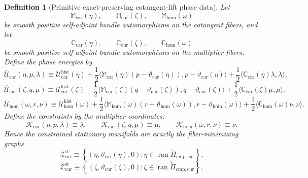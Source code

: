 \documentclass[11pt]{article}
\newcommand{\TensorEqCmpProj}{\widetilde\Pi_{\mathrm{cmp,car}}}
\newcommand{\CurEqCmpProj}{\widetilde\Pi_{\mathrm{cmp,cur}}}
\newcommand{\TensorConstraint}{\mathcal K_{\mathrm{car}}}
\newcommand{\CurConstraint}{\mathcal K_{\mathrm{cur}}}
\newcommand{\HomConstraint}{\mathcal K_{\mathrm{hom}}}
\newcommand{\TensorPhaseEnergy}{\overline{\mathcal U}_{\mathrm{car}}}
\newcommand{\CurPhaseEnergy}{\overline{\mathcal U}_{\mathrm{cur}}}
\newcommand{\HomPhaseEnergy}{\overline{\mathcal U}_{\mathrm{hom}}}
\newcommand{\TensorStationaryManifold}{\mathcal Z_{\mathrm{car}}^{\mathrm{st}}}
\newcommand{\CurStationaryManifold}{\mathcal Z_{\mathrm{cur}}^{\mathrm{st}}}
\newtheorem{definition}{Definition}
\begin{document}
\begin{definition}[Primitive exact-preserving cotangent-lift phase data]
Let
\[
\mathbb M_{\mathrm{car}}(\eta),\qquad
\mathbb M_{\mathrm{cur}}(\zeta),\qquad
\mathbb M_{\mathrm{hom}}(\omega)
\]
be smooth positive self-adjoint bundle automorphisms on the cotangent fibers, and let
\[
\mathbb C_{\mathrm{car}}(\eta),\qquad
\mathbb C_{\mathrm{cur}}(\zeta),\qquad
\mathbb C_{\mathrm{hom}}(\omega)
\]
be smooth positive self-adjoint bundle automorphisms on the multiplier fibers. Define the phase energies by
\begin{equation}
\TensorPhaseEnergy(\eta,p,\lambda)
\equiv
\mathcal U_{\mathrm{car}}^{\mathrm{hist}}(\eta)
+
\frac12\langle\mathbb M_{\mathrm{car}}(\eta)(p-\vartheta_{\mathrm{car}}(\eta)),p-\vartheta_{\mathrm{car}}(\eta)\rangle
+
\frac12\langle\mathbb C_{\mathrm{car}}(\eta)\lambda,\lambda\rangle,
\label{eq:cotangent_phase_energy_car}
\end{equation}
\begin{equation}
\CurPhaseEnergy(\zeta,q,\mu)
\equiv
\mathcal U_{\mathrm{cur}}^{\mathrm{hist}}(\zeta)
+
\frac12\langle\mathbb M_{\mathrm{cur}}(\zeta)(q-\vartheta_{\mathrm{cur}}(\zeta)),q-\vartheta_{\mathrm{cur}}(\zeta)\rangle
+
\frac12\langle\mathbb C_{\mathrm{cur}}(\zeta)\mu,\mu\rangle,
\label{eq:cotangent_phase_energy_cur}
\end{equation}
\begin{equation}
\HomPhaseEnergy(\omega,r,\nu)
\equiv
\mathcal U_{\mathrm{hom}}^{\mathrm{hist}}(\omega)
+
\frac12\langle\mathbb M_{\mathrm{hom}}(\omega)(r-\vartheta_{\mathrm{hom}}(\omega)),r-\vartheta_{\mathrm{hom}}(\omega)\rangle
+
\frac12\langle\mathbb C_{\mathrm{hom}}(\omega)\nu,\nu\rangle.
\label{eq:cotangent_phase_energy_hom}
\end{equation}
Define the constraints by the multiplier coordinates:
\begin{equation}
\TensorConstraint(\eta,p,\lambda)\equiv\lambda,\qquad
\CurConstraint(\zeta,q,\mu)\equiv\mu,\qquad
\HomConstraint(\omega,r,\nu)\equiv\nu.
\label{eq:cotangent_constraints}
\end{equation}
Hence the constrained stationary manifolds are exactly the fiber-minimizing graphs
\begin{equation}
\TensorStationaryManifold
\equiv
\left\{
(\eta,\vartheta_{\mathrm{car}}(\eta),0):
\eta\in\operatorname{ran}\TensorEqCmpProj
\right\},
\label{eq:cotangent_stationary_car}
\end{equation}
\begin{equation}
\CurStationaryManifold
\equiv
\left\{
(\zeta,\vartheta_{\mathrm{cur}}(\zeta),0):
\zeta\in\operatorname{ran}\CurEqCmpProj
\right\},

\end{equation}
\end{definition}
\end{document}
